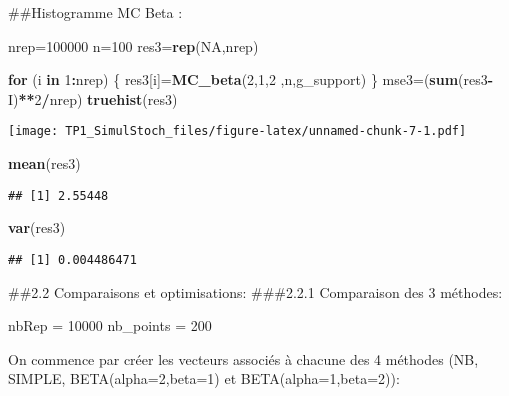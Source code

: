 \documentclass[]{article}
\newenvironment{Shaded}{\begin{snugshade}}{\end{snugshade}}
\newcommand{\ControlFlowTok}[1]{\textcolor[rgb]{0.13,0.29,0.53}{\textbf{#1}}}
\newcommand{\DecValTok}[1]{\textcolor[rgb]{0.00,0.00,0.81}{#1}}
\newcommand{\KeywordTok}[1]{\textcolor[rgb]{0.13,0.29,0.53}{\textbf{#1}}}
\newcommand{\NormalTok}[1]{#1}
\newcommand{\OperatorTok}[1]{\textcolor[rgb]{0.81,0.36,0.00}{\textbf{#1}}}
\newcommand{\OtherTok}[1]{\textcolor[rgb]{0.56,0.35,0.01}{#1}}
\newcommand{\StringTok}[1]{\textcolor[rgb]{0.31,0.60,0.02}{#1}}
\begin{document}
\#\#Histogramme MC Beta :

\begin{Shaded}
\begin{Highlighting}[]
\NormalTok{nrep=}\DecValTok{100000}
\NormalTok{n=}\DecValTok{100}
\NormalTok{res3=}\KeywordTok{rep}\NormalTok{(}\OtherTok{NA}\NormalTok{,nrep)}

\ControlFlowTok{for}\NormalTok{ (i }\ControlFlowTok{in} \DecValTok{1}\OperatorTok{:}\NormalTok{nrep) \{}
\NormalTok{  res3[i]=}\KeywordTok{MC_beta}\NormalTok{(}\DecValTok{2}\NormalTok{,}\DecValTok{1}\NormalTok{,}\DecValTok{2}\NormalTok{ ,n,g_support)}
\NormalTok{\}}
\NormalTok{mse3=(}\KeywordTok{sum}\NormalTok{(res3}\OperatorTok{-}\NormalTok{I)}\OperatorTok{**}\DecValTok{2}\OperatorTok{/}\NormalTok{nrep)}
\KeywordTok{truehist}\NormalTok{(res3)}
\end{Highlighting}
\end{Shaded}

\texttt{[image: TP1\_SimulStoch\_files/figure-latex/unnamed-chunk-7-1.pdf]}

\begin{Shaded}
\begin{Highlighting}[]
\KeywordTok{mean}\NormalTok{(res3)}
\end{Highlighting}
\end{Shaded}

\begin{verbatim}
## [1] 2.55448
\end{verbatim}

\begin{Shaded}
\begin{Highlighting}[]
\KeywordTok{var}\NormalTok{(res3)}
\end{Highlighting}
\end{Shaded}

\begin{verbatim}
## [1] 0.004486471
\end{verbatim}

\#\#2.2 Comparaisons et optimisations: \#\#\#2.2.1 Comparaison des 3
méthodes:

\begin{Shaded}
\begin{Highlighting}[]
\NormalTok{nbRep =}\StringTok{ }\DecValTok{10000}
\NormalTok{nb_points =}\StringTok{ }\DecValTok{200}
\end{Highlighting}
\end{Shaded}

On commence par créer les vecteurs associés à chacune des 4 méthodes
(NB, SIMPLE, BETA(alpha=2,beta=1) et BETA(alpha=1,beta=2)):
\end{document}
